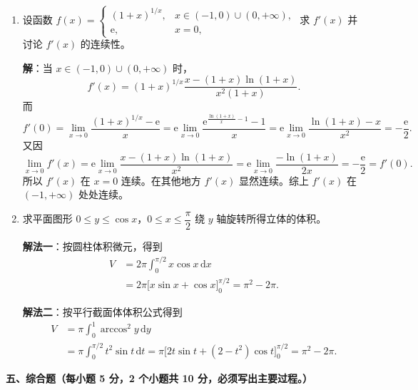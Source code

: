 \documentclass[a4paper,11pt]{ctexart}
\newcommand{\dd}{\,\mathrm{d}}
\newcommand{\e}{\mathrm{e}}
\newcommand{\score}[1]{\hfill{\text{（#1 分）}}}
\begin{document}
\begin{enumerate}[label=\arabic*., start=17, leftmargin=2em, itemsep=1.0em, topsep=0.6em]
  \item 设函数 $f(x)=\begin{cases}(1+x)^{1/x}, & x\in(-1,0)\cup(0,+\infty),\\ \e, & x=0,\end{cases}$ 求 $f'(x)$ 并讨论 $f'(x)$ 的连续性。

  \textbf{解}：当 $x\in(-1,0)\cup(0,+\infty)$ 时，
  \[
    f'(x) = (1+x)^{1/x}\frac{x-(1+x)\ln(1+x)}{x^2(1+x)}. \tag*{（2 分）}
  \]
  而
  \[
    f'(0) = \lim_{x\to 0}\frac{(1+x)^{1/x}-\e}{x}
    = \e\lim_{x\to 0}\frac{\e^{\frac{\ln(1+x)}{x}-1}-1}{x}
    = \e\lim_{x\to 0}\frac{\ln(1+x)-x}{x^2}
    = -\frac{\e}{2}. \tag*{（4 分）}
  \]
  又因
  \[
    \lim_{x\to 0} f'(x) = \e\lim_{x\to 0}\frac{x-(1+x)\ln(1+x)}{x^2}
    = \e\lim_{x\to 0}\frac{-\ln(1+x)}{2x} = -\frac{\e}{2} = f'(0).
  \]
  所以 $f'(x)$ 在 $x=0$ 连续。在其他地方 $f'(x)$ 显然连续。综上 $f'(x)$ 在 $(-1,+\infty)$ 处处连续。\score{7}

  \item 求平面图形 $0\le y\le \cos x$，$0\le x\le\dfrac{\pi}{2}$ 绕 $y$ 轴旋转所得立体的体积。

  \textbf{解法一}：按圆柱体积微元，得到
  \begin{align*}
    V &= 2\pi\int_0^{\pi/2} x\cos x\dd x \tag*{（4 分）}\\
      &= 2\pi\bigl[x\sin x+\cos x\bigr]_0^{\pi/2} = \pi^2 - 2\pi. \tag*{（7 分）}
  \end{align*}

  \textbf{解法二}：按平行截面体体积公式得到
  \begin{align*}
    V &= \pi\int_0^1 \arccos^2 y\dd y \tag*{（4 分）}\\
      &= \pi\int_0^{\pi/2} t^2\sin t\dd t = \pi\bigl[2t\sin t + (2-t^2)\cos t\bigr]_0^{\pi/2} = \pi^2 - 2\pi. \tag*{（7 分）}
  \end{align*}
\end{enumerate}

\vspace{0.8em}

\textbf{五、综合题（每小题 5 分，2 个小题共 10 分，必须写出主要过程。）}
\end{document}
